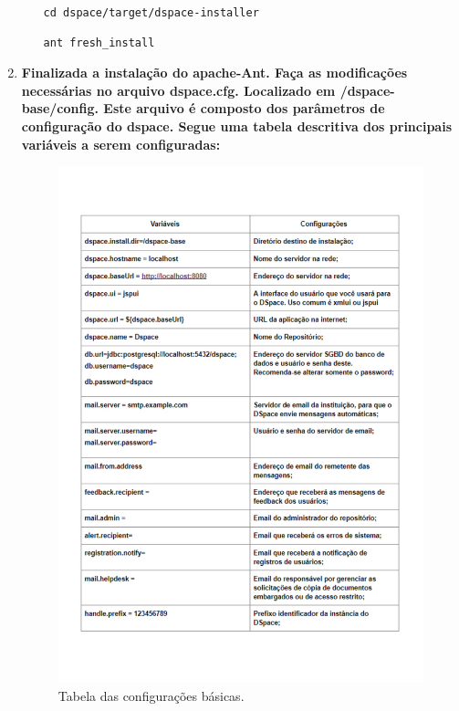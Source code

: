 \documentclass[12pt,hidelinks]{article}
\begin{document}
\begin{enumerate}
\begin{enumerate}
            \texttt{cd dspace/target/dspace-installer}\\
            
            \begin{verbatim}
ant fresh_install
            \end{verbatim}

            \end{enumerate}
            
        \item \textbf{Finalizada a instalação do apache-Ant. Faça as modificações necessárias no arquivo dspace.cfg. Localizado em /dspace-base/config. Este arquivo é composto dos parâmetros de configuração do dspace. Segue uma tabela descritiva dos principais variáveis a serem configuradas:}
            
        \begin{figure}[!ph]
            \centering
            \includegraphics[scale=0.7]{figura/variaveis.pdf}
            \caption{Tabela das configurações básicas.}
        \label{Rotulo}
        \end{figure}
        

\end{enumerate}
\end{document}
